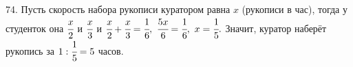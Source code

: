 74. Пусть скорость набора рукописи куратором равна $x$ (рукописи в час), тогда у студенток она $\cfrac{x}{2}$ и $\cfrac{x}{3}$ и $\cfrac{x}{2}+\cfrac{x}{3}=\cfrac{1}{6},\ \cfrac{5x}{6}=\cfrac{1}{6},\ x=\cfrac{1}{5}.$ Значит, куратор наберёт рукопись за $1:\cfrac{1}{5}=5$ часов.\\

